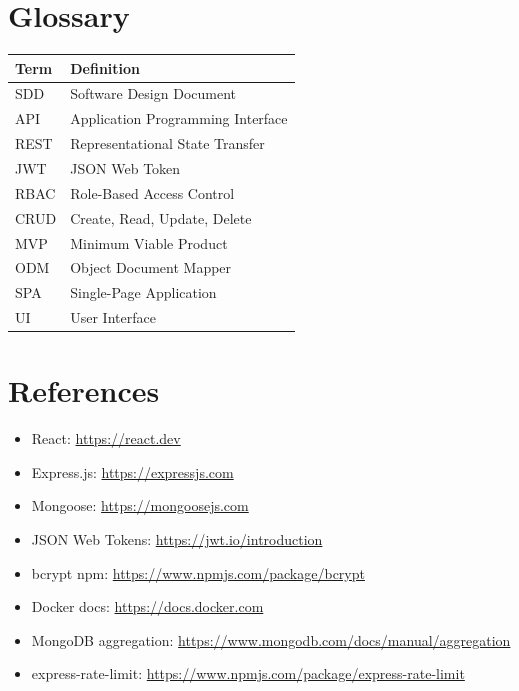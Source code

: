 \documentclass[12pt]{article}
\begin{document}
\section*{Glossary}

\begin{longtable}{|p{3cm}|p{10cm}|}
\hline
\textbf{Term} & \textbf{Definition} \\
\hline
SDD   & Software Design Document \\
\hline
API   & Application Programming Interface \\
\hline
REST  & Representational State Transfer \\
\hline
JWT   & JSON Web Token \\
\hline
RBAC  & Role-Based Access Control \\
\hline
CRUD  & Create, Read, Update, Delete \\
\hline
MVP   & Minimum Viable Product \\
\hline
ODM   & Object Document Mapper \\
\hline
SPA   & Single-Page Application \\
\hline
UI    & User Interface \\
\hline
\end{longtable}

\section*{References}

\begin{itemize}
    \item React: \url{https://react.dev}
    \item Express.js: \url{https://expressjs.com}
    \item Mongoose: \url{https://mongoosejs.com}
    \item JSON Web Tokens: \url{https://jwt.io/introduction}
    \item bcrypt npm: \url{https://www.npmjs.com/package/bcrypt}
    \item Docker docs: \url{https://docs.docker.com}
    \item MongoDB aggregation: \url{https://www.mongodb.com/docs/manual/aggregation}
    \item express-rate-limit: \url{https://www.npmjs.com/package/express-rate-limit}
\end{itemize}
\end{document}
